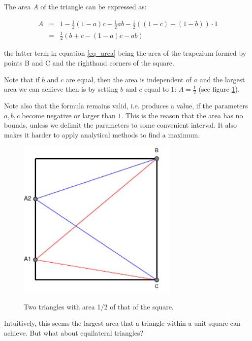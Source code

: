 \documentclass[onecolumn]{article}
\begin{document}
The area $A$  of the triangle can be expressed as:

\begin{eqnarray}
\label{eq_area} A &=& 1 - \frac{1}{2}(1-a) c - \frac{1}{2}a b - \frac{1}{2} ((1-c)+(1-b)) \cdot 1 \\
  &=& \frac{1}{2} (b + c - (1-a)c -ab)
\end{eqnarray}

\noindent the latter term in equation \ref{eq_area} being the area of the trapezium formed by points B and C and the righthand corners of the square.

Note that if $b$ and $c$ are equal, then the area is independent of $a$ and the largest area we can achieve then is by setting
$b$ and $c$ equal to $1$: $A = \frac{1}{2}$ (see figure \ref{triangle_area_half}).

Note also that the formula remains valid, i.e. produces a value, if the parameters $a, b, c$ become negative or larger than $1$. This is the
reason that the area has no bounds, unless we delimit the parameters to some convenient interval. It also makes it harder
to apply analytical methods to find a maximum.

\begin{figure}[h]
\begin{center}
\caption{Two triangles with area 1/2 of that of the square.}
\includegraphics[width=0.7\textwidth]{triangle_area_half.pdf}
\label{triangle_area_half}
\end{center}
\end{figure}

Intuitively, this seems the largest area that a triangle within a unit square can achieve. But what about equilateral
triangles?
\end{document}
